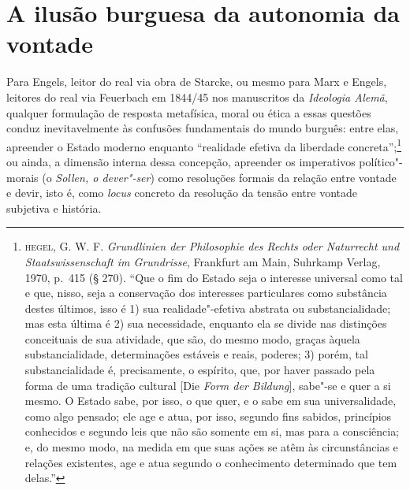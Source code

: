 \section*{A ilusão burguesa da autonomia da vontade}

Para Engels, leitor do real via obra de Starcke, ou mesmo para Marx e
Engels, leitores do real via Feuerbach em 1844/45 nos manuscritos da
\emph{Ideologia Alemã}, qualquer formulação de resposta metafísica,
moral ou ética a essas questões conduz inevitavelmente às confusões
fundamentais do mundo burguês: entre elas, apreender o Estado moderno
enquanto ``realidade efetiva da liberdade concreta'';\footnote{\textsc{hegel},
  G. W. F. \emph{Grundlinien der Philosophie des Rechts oder Naturrecht
  und Staatswissenschaft im Grundrisse}, Frankfurt am Main, Suhrkamp
  Verlag, 1970, p.~415 (§ 270). ``Que o fim do Estado seja o interesse
  universal como tal e que, nisso, seja a conservação dos interesses
  particulares como substância destes últimos, isso é 1) sua
  realidade"-efetiva abstrata ou substancialidade; mas esta última é 2)
  sua necessidade, enquanto ela se divide nas distinções conceituais de
  sua atividade, que são, do mesmo modo, graças àquela substancialidade,
  determinações estáveis e reais, poderes; 3) porém, tal
  substancialidade é, precisamente, o espírito, que, por haver passado
  pela forma de uma tradição cultural {[}Die \emph{Form der Bildung}{]},
  sabe"-se e quer a si mesmo. O Estado sabe, por isso, o que quer, e o
  sabe em sua universalidade, como algo pensado; ele age e atua, por
  isso, segundo fins sabidos, princípios conhecidos e segundo leis que
  não são somente em si, mas para a consciência; e, do mesmo modo, na
  medida em que suas ações se atêm às circunstâncias e relações
  existentes, age e atua segundo o conhecimento determinado que tem
  delas.''} ou ainda, a dimensão interna dessa concepção, apreender os
imperativos político"-morais (o \emph{Sollen, o dever"-ser}) como
resoluções formais da relação entre vontade e devir, isto é, como
\emph{locus} concreto da resolução da tensão entre vontade subjetiva e
história.

